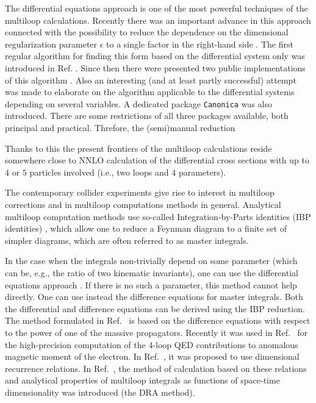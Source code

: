\documentclass[sort&compress]{elsarticle}
\begin{document}
The differential equations approach \cite{Kotikov1991b,Remiddi1997}  is one of the most powerful techniques of the multiloop calculations. 
Recently there was an important advance in this approach connected with the possibility to reduce the dependence on the dimensional regularization parameter $\epsilon$ to a single factor in the right-hand side \cite{Henn2013}. The first regular algorithm for finding this form based on the differential system only was introduced in Ref. \cite{Lee2015}. Since then there were presented two public implementations of this algorithm \cite{epsilon,fuchsia}. Also an interesting (and at least partly successful) attempt was made \cite{Maier} to elaborate on the algorithm applicable to the differential systems depending on several variables. A dedicated package \texttt{Canonica} \cite{MeierCanonica} was also introduced. There are some restrictions of all three packages available, both principal and practical. Threfore, the (semi)manual reduction 

Thanks to this the present frontiers of the multiloop calculations reside somewhere close to $\mathrm{NNLO}$ calculation of the differential cross sections with up to $4$ or $5$ particles involved (i.e., two loops and $4$ parameters). 

The contemporary collider experiments give rise to interest in multiloop corrections and in multiloop computations methods in general.
Analytical multiloop computation methods use so-called Integration-by-Parts identities (IBP identities) \cite{ChetTka1981,Tkachov1981}, which allow one to reduce a Feynman diagram to a finite set of simpler diagrams, which are often referred to as master integrals.

In the case when the integrals non-trivially depend on some parameter (which can be, e.g., the ratio of two kinematic invariants), one can use the differential equations approach \cite{Kotikov1991b,Remiddi1997}.
If there is no such a parameter, this method cannot help directly.
One can use instead the difference equations for master integrals.
Both the differential and difference equations can be derived using the IBP reduction.
The method formulated in Ref.~\cite{Laporta2000} is based on the difference equations with respect to the power of one of the massive propagators.
Recently it was used in Ref.~\cite{Laporta2017} for the high-precision computation of the 4-loop QED contributions to anomalous magnetic moment of the electron.
In Ref.~\cite{Tarasov1996}, it was proposed to use dimensional recurrence relations.
In Ref.~\cite{Lee2010}, the method of calculation based on these relations and analytical properties of multiloop integrals as functions of space-time dimensionality was introduced (the DRA method).
\end{document}
